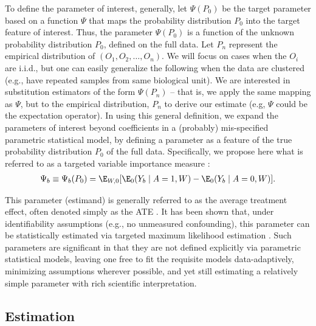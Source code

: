 To define the parameter of interest, generally, let $\Psi(P_{0})$ be the
target parameter based on a function $\Psi$ that maps the probability
distribution $P_{0}$ into the target feature of interest. Thus, the parameter
$\Psi(P_{0})$ is a function of the unknown probability distribution $P_{0}$,
defined on the full data. Let $P_{n}$ represent the  empirical distribution of
$(O_{1},O_{2}, \dots, O_{n})$. We will focus on cases when the $O_i$ are
i.i.d., but one can easily generalize the following when the data are clustered
(e.g., have repeated samples from same biological unit). We are interested in
substitution estimators of the form $\Psi(P_{n})$ -- that is, we apply the same
mapping as $\Psi$, but to the empirical distribution, $P_n$ to derive our
estimate (e.g, $\Psi$ could be the expectation operator). In using this general
definition, we expand the parameters of interest beyond coefficients in a
(probably) mis-specified parametric statistical model, by defining a parameter
as a feature of the true probability distribution $P_{0}$ of the full data.
Specifically, we propose here what is referred to as a targeted variable
importance measure
\cite{bembom2009biomarker}:
\begin{eqnarray}
\label{target_p}
\Psi_{b} \equiv \Psi_{b}(P_{0}) = \E _{W,0}[\E_{0}(Y_{b} \mid A = 1, W) -
\E_{0}(Y_{b} \mid A = 0, W)].
\end{eqnarray}

This parameter (estimand) is generally referred to as the average treatment
effect, often denoted simply as the ATE \cite{rosenbaum1983central}. It has
been shown that, under identifiability assumptions (e.g., no unmeasured
confounding), this parameter can be statistically estimated via targeted
maximum likelihood estimation \cite{van2011targeted}. Such parameters are
significant in that they are not defined explicitly via parametric statistical
models, leaving one free to fit the requisite models  data-adaptively,
minimizing assumptions wherever possible, and yet still estimating a relatively
simple parameter with rich scientific interpretation.

\subsection{Estimation}\label{estimation}


